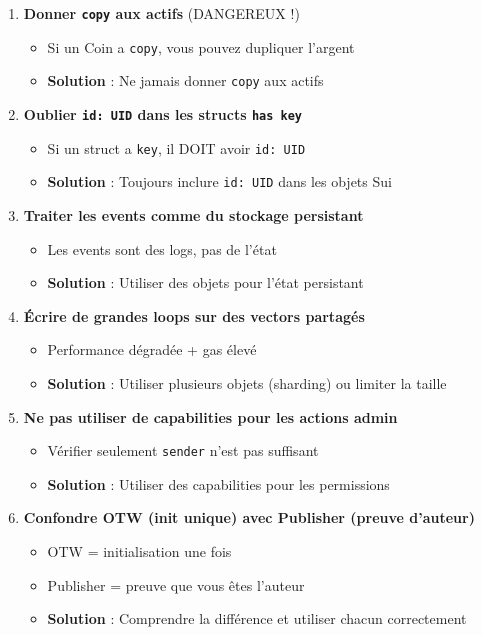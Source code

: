 \documentclass[11pt]{article}
\begin{document}
\begin{enumerate}
  \item \textbf{Donner \texttt{copy} aux actifs} (DANGEREUX !)
  \begin{itemize}
    \item Si un Coin a \texttt{copy}, vous pouvez dupliquer l'argent
    \item \textbf{Solution} : Ne jamais donner \texttt{copy} aux actifs
  \end{itemize}
  
  \item \textbf{Oublier \texttt{id: UID} dans les structs \texttt{has key}}
  \begin{itemize}
    \item Si un struct a \texttt{key}, il DOIT avoir \texttt{id: UID}
    \item \textbf{Solution} : Toujours inclure \texttt{id: UID} dans les objets Sui
  \end{itemize}
  
  \item \textbf{Traiter les events comme du stockage persistant}
  \begin{itemize}
    \item Les events sont des logs, pas de l'état
    \item \textbf{Solution} : Utiliser des objets pour l'état persistant
  \end{itemize}
  
  \item \textbf{Écrire de grandes loops sur des vectors partagés}
  \begin{itemize}
    \item Performance dégradée + gas élevé
    \item \textbf{Solution} : Utiliser plusieurs objets (sharding) ou limiter la taille
  \end{itemize}
  
  \item \textbf{Ne pas utiliser de capabilities pour les actions admin}
  \begin{itemize}
    \item Vérifier seulement \texttt{sender} n'est pas suffisant
    \item \textbf{Solution} : Utiliser des capabilities pour les permissions
  \end{itemize}
  
  \item \textbf{Confondre OTW (init unique) avec Publisher (preuve d'auteur)}
  \begin{itemize}
    \item OTW = initialisation une fois
    \item Publisher = preuve que vous êtes l'auteur
    \item \textbf{Solution} : Comprendre la différence et utiliser chacun correctement
  \end{itemize}
\end{enumerate}
\end{document}
